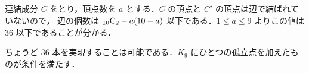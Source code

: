 \subsection{}
連結成分 $C$ をとり，頂点数を $a$ とする．$C$ の頂点と $C'$ の頂点は辺で結ばれていないので，
辺の個数は ${}_{10}\mathrm{C}_{2} - a(10-a)$ 以下である．$1\leq a\leq 9$ よりこの値は $36$ 以下であることが分かる．

ちょうど $36$ 本を実現することは可能である．$K_9$ にひとつの孤立点を加えたものが条件を満たす．

